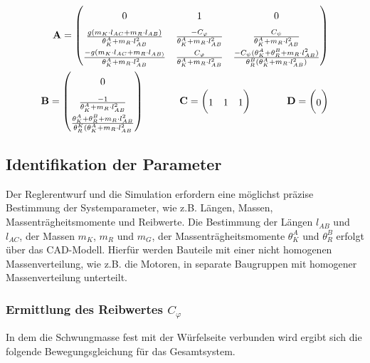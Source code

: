 \begin{equation}
\begin{split}
\renewcommand*{\arraystretch}{1.7}
\textbf{A} = \begin{pmatrix}
0 & 1 & 0 \\
\frac{g(m_K \cdot l_{AC} + m_R \cdot l_{AB})}{{\theta}^A_K + m_R \cdot l_{AB}^2} &
\frac{-C_{\varphi}}{{\theta}^A_K + m_R \cdot l_{AB}^2} & 
\frac{C_{\psi}}{{\theta}^A_K + m_R \cdot l_{AB}^2} \\
\frac{-g(m_K \cdot l_{AC} + m_R \cdot l_{AB)}}{{\theta}^A_K + m_R \cdot l_{AB}^2} &
\frac{C_{\varphi}}{{\theta}^A_K + m_R \cdot l_{AB}^2} &
\frac{-C_{\psi}({\theta}^A_K + {\theta}^B_R + m_R \cdot l_{AB}^2)}{{\theta}^B_R({\theta}^A_K + m_R \cdot l_{AB}^2)}
\end{pmatrix} 
\\
\renewcommand*{\arraystretch}{1.7}
\textbf{B} = \begin{pmatrix}
0 \\ \frac{-1}{{\theta}^A_K + m_R \cdot l_{AB}^2} \\ \frac{{\theta}^A_K + {\theta}^B_R + m_R \cdot l_{AB}^2}{{\theta}^K_R({\theta}^A_K + m_R \cdot l_{AB}^2}
\end{pmatrix}
\hspace{35 pt}
\textbf{C} = \begin{pmatrix}
1 & 1 & 1
\end{pmatrix}
\hspace{35pt}
\textbf{D} = \begin{pmatrix}
0
\end{pmatrix}
\end{split}
\end{equation}

\subsection{Identifikation der Parameter}
Der Reglerentwurf und die Simulation erfordern eine möglichst präzise Bestimmung der Systemparameter, wie z.B. Längen, Massen, Massenträgheitsmomente und Reibwerte. Die Bestimmung der Längen $l_{AB}$ und $l_{AC}$, der Massen $m_K$, $m_R$ und $m_G$, der Massenträgheitsmomente $\theta^A_K$ und $\theta^B_R$ erfolgt über das CAD-Modell. Hierfür werden Bauteile mit einer nicht homogenen Massenverteilung, wie z.B. die Motoren, in separate Baugruppen mit homogener Massenverteilung unterteilt.

\subsubsection{Ermittlung des Reibwertes $C_{\varphi}$}
In dem die Schwungmasse fest mit der Würfelseite verbunden wird ergibt sich die folgende Bewegungsgleichung für das Gesamtsystem.

